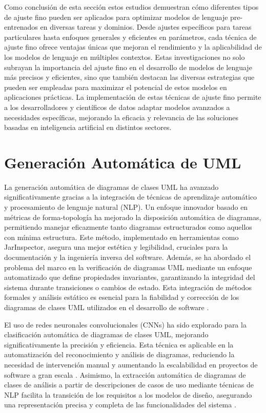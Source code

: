 Como conclusión de esta sección estos estudios demuestran cómo diferentes tipos de ajuste fino pueden ser aplicados para optimizar modelos de lenguaje pre-entrenados en diversas tareas y dominios. Desde ajustes específicos para tareas particulares hasta enfoques generales y eficientes en parámetros, cada técnica de ajuste fino ofrece ventajas únicas que mejoran el rendimiento y la aplicabilidad de los modelos de lenguaje en múltiples contextos. Estas investigaciones no solo subrayan la importancia del ajuste fino en el desarrollo de modelos de lenguaje más precisos y eficientes, sino que también destacan las diversas estrategias que pueden ser empleadas para maximizar el potencial de estos modelos en aplicaciones prácticas. La implementación de estas técnicas de ajuste fino permite a los desarrolladores y científicos de datos adaptar modelos avanzados a necesidades específicas, mejorando la eficacia y relevancia de las soluciones basadas en inteligencia artificial en distintos sectores.


\section{Generación Automática de UML}

La generación automática de diagramas de clases UML ha avanzado significativamente gracias a la integración de técnicas de aprendizaje automático y procesamiento de lenguaje natural (NLP). Un enfoque innovador basado en métricas de forma-topología ha mejorado la disposición automática de diagramas, permitiendo manejar eficazmente tanto diagramas estructurados como aquellos con mínima estructura. Este método, implementado en herramientas como JarInspector, asegura una mejor estética y legibilidad, cruciales para la documentación y la ingeniería inversa del software. Además, se ha abordado el problema del marco en la verificación de diagramas UML mediante un enfoque automatizado que define propiedades invariantes, garantizando la integridad del sistema durante transiciones o cambios de estado. Esta integración de métodos formales y análisis estático es esencial para la fiabilidad y corrección de los diagramas de clases UML utilizados en el desarrollo de software \cite{Eiglsperger2003}.

El uso de redes neuronales convolucionales (CNNs) ha sido explorado para la clasificación automática de diagramas de clases UML, mejorando significativamente la precisión y eficiencia. Esta técnica es aplicable en la automatización del reconocimiento y análisis de diagramas, reduciendo la necesidad de intervención manual y aumentando la escalabilidad en proyectos de software a gran escala \cite{Viesca2023}. Asimismo, la extracción automática de diagramas de clases de análisis a partir de descripciones de casos de uso mediante técnicas de NLP facilita la transición de los requisitos a los modelos de diseño, asegurando una representación precisa y completa de las funcionalidades del sistema \cite{Gosala2021}.

